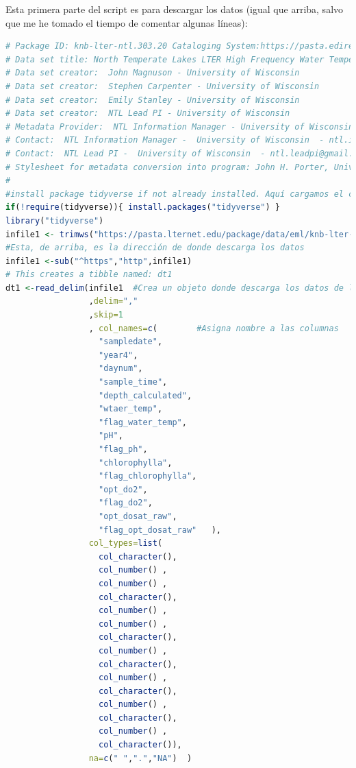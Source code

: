 \documentclass[
]{book}
\begin{document}
Esta primera parte del script es para descargar los datos (igual que arriba, salvo que me he tomado el tiempo de comentar algunas líneas):

\begin{lstlisting}[language=R]
# Package ID: knb-lter-ntl.303.20 Cataloging System:https://pasta.edirepository.org.
# Data set title: North Temperate Lakes LTER High Frequency Water Temperature Data, Dissolved Oxygen, Chlorophyll, pH - Crystal Lake 2011 - 2014.
# Data set creator:  John Magnuson - University of Wisconsin 
# Data set creator:  Stephen Carpenter - University of Wisconsin 
# Data set creator:  Emily Stanley - University of Wisconsin 
# Data set creator:  NTL Lead PI - University of Wisconsin 
# Metadata Provider:  NTL Information Manager - University of Wisconsin 
# Contact:  NTL Information Manager -  University of Wisconsin  - ntl.infomgr@gmail.com
# Contact:  NTL Lead PI -  University of Wisconsin  - ntl.leadpi@gmail.com
# Stylesheet for metadata conversion into program: John H. Porter, Univ. Virginia, jporter@Virginia.edu 
#
#install package tidyverse if not already installed. Aquí cargamos el conjunto de paquetes que están dentro de "tidyverse" y si no lo tuvieramos instaldo, han pensado en nosotros y, se instala solo.
if(!require(tidyverse)){ install.packages("tidyverse") }  
library("tidyverse") 
infile1 <- trimws("https://pasta.lternet.edu/package/data/eml/knb-lter-ntl/303/20/b9b3b932deec8f3e71fb8d70cacf6a0e") 
#Esta, de arriba, es la dirección de donde descarga los datos
infile1 <-sub("^https","http",infile1)
# This creates a tibble named: dt1 
dt1 <-read_delim(infile1  #Crea un objeto donde descarga los datos de la dirección que le damos, guardada en el objeto con nombre "infile1"
                 ,delim=","   
                 ,skip=1 
                 , col_names=c(        #Asigna nombre a las columnas
                   "sampledate",   
                   "year4",   
                   "daynum",   
                   "sample_time",   
                   "depth_calculated",   
                   "wtaer_temp",   
                   "flag_water_temp",   
                   "pH",   
                   "flag_ph",   
                   "chlorophylla",   
                   "flag_chlorophylla",   
                   "opt_do2",   
                   "flag_do2",   
                   "opt_dosat_raw",   
                   "flag_opt_dosat_raw"   ), 
                 col_types=list(
                   col_character(), 
                   col_number() , 
                   col_number() , 
                   col_character(), 
                   col_number() , 
                   col_number() ,  
                   col_character(), 
                   col_number() ,  
                   col_character(), 
                   col_number() ,  
                   col_character(), 
                   col_number() ,  
                   col_character(), 
                   col_number() ,  
                   col_character()), 
                 na=c(" ",".","NA")  )
\end{lstlisting}
\end{document}
